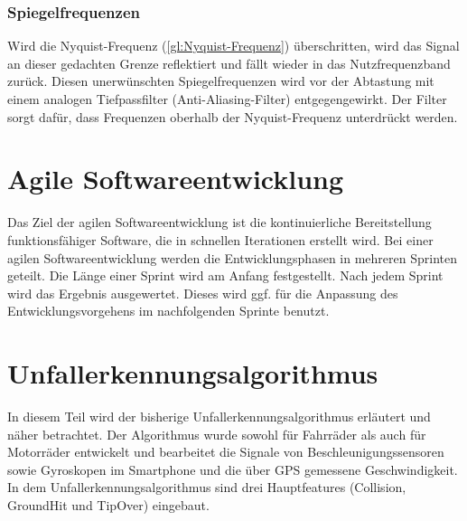 \subsubsection{Spiegelfrequenzen}
Wird die Nyquist-Frequenz (\autoref{gl:Nyquist-Frequenz}) überschritten, wird das Signal an dieser gedachten Grenze reflektiert und fällt wieder in das Nutzfrequenzband zurück. Diesen unerwünschten Spiegelfrequenzen wird vor der Abtastung mit einem analogen Tiefpassfilter (Anti-Aliasing-Filter) entgegengewirkt. Der Filter sorgt dafür, dass Frequenzen oberhalb der Nyquist-Frequenz unterdrückt werden. \citep{NTIAudioFFT}\citep{WeissteinFFT}






%
%
%
%
%
%
%



\section{Agile Softwareentwicklung}\label{abs:MethodenderSoftwareentwicklung}
Das Ziel der agilen Softwareentwicklung ist die kontinuierliche Bereitstellung funktionsfähiger Software, die in schnellen Iterationen erstellt wird. 
Bei einer agilen Softwareentwicklung werden die Entwicklungsphasen in mehreren Sprinten geteilt. Die Länge einer Sprint wird am Anfang festgestellt. Nach jedem Sprint wird das Ergebnis ausgewertet. Dieses wird ggf. für die Anpassung des Entwicklungsvorgehens im nachfolgenden Sprinte benutzt. \citep{Brunskill2019}



%
%
%
%
%
%
%
\section{Unfallerkennungsalgorithmus} \label{abs:Unfallerkennungsalgorithmus}
%
%
%
%

In diesem Teil wird der bisherige Unfallerkennungsalgorithmus erläutert und näher betrachtet. Der Algorithmus wurde sowohl für Fahrräder als auch für Motorräder entwickelt und bearbeitet die Signale von Beschleunigungssensoren sowie Gyroskopen im Smartphone und die über GPS gemessene Geschwindigkeit. In dem Unfallerkennungsalgorithmus sind drei Hauptfeatures (Collision, GroundHit und TipOver) eingebaut.

